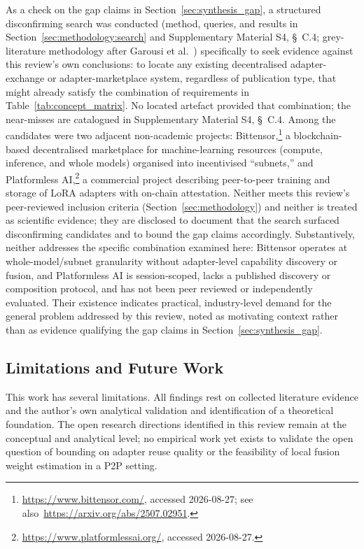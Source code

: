 As a check on the gap claims in Section~\ref{sec:synthesis_gap}, a structured
disconfirming search was conducted (method, queries, and results in
Section~\ref{sec:methodology:search} and
Supplementary Material S4, \S~C.4; grey-literature methodology after
Garousi et al.~\cite{Garousi2019}) specifically to seek evidence against this
review's own conclusions: to locate any existing decentralised
adapter-exchange or adapter-marketplace system, regardless of publication type,
that might already satisfy the combination of requirements in
Table~\ref{tab:concept_matrix}. No located artefact provided that combination;
the near-misses are catalogued in Supplementary Material S4, \S~C.4. Among the
candidates were two adjacent non-academic projects: Bittensor,\footnote{\url{https://www.bittensor.com/}, accessed 2026-08-27; see also~\url{https://arxiv.org/abs/2507.02951}.} a blockchain-based decentralised
marketplace for machine-learning resources (compute, inference, and whole
models) organised into incentivised ``subnets,'' and Platformless
AI,\footnote{\url{https://www.platformlessai.org/}, accessed 2026-08-27.} a
commercial project describing peer-to-peer training and storage of LoRA
adapters with on-chain attestation. Neither meets this review's peer-reviewed
inclusion criteria (Section~\ref{sec:methodology}) and neither is treated as
scientific evidence; they are disclosed to document that the search surfaced
disconfirming candidates and to bound the gap claims accordingly.
Substantively, neither addresses the specific combination examined here:
Bittensor operates at whole-model/subnet granularity without adapter-level
capability discovery or fusion, and Platformless AI is session-scoped, lacks a
published discovery or composition protocol, and has not been peer reviewed or
independently evaluated. Their existence indicates practical, industry-level
demand for the general problem addressed by this review, noted as motivating
context rather than as evidence qualifying the gap claims in
Section~\ref{sec:synthesis_gap}.

\subsection{Limitations and Future Work}
\label{sec:conclusion:limitations}

This work has several limitations. All findings rest on collected
literature evidence and the author's own analytical validation and
identification of a theoretical foundation. The open research directions identified in this review remain at the conceptual and analytical level; no empirical work yet exists to validate the open question of bounding on adapter reuse quality or the feasibility of local fusion weight estimation in a P2P setting.

